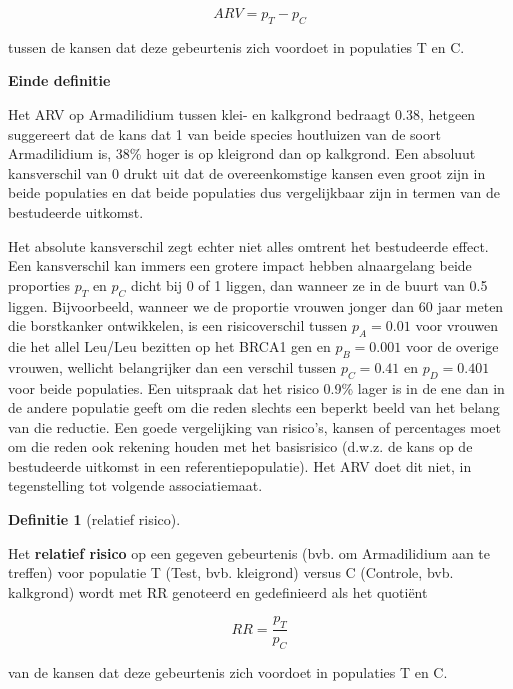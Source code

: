 \documentclass[
  12pt,dutch]{book}
\theoremstyle{definition}
\newtheorem{definition}{Definitie}[chapter]
\theoremstyle{definition}
\theoremstyle{definition}
\theoremstyle{definition}
\theoremstyle{remark}
\begin{document}
\begin{equation*}
ARV=p_T-p_C
\end{equation*}

tussen de kansen dat deze gebeurtenis zich voordoet in populaties T en C.

\textbf{Einde definitie}

Het ARV op Armadilidium tussen klei- en kalkgrond bedraagt 0.38, hetgeen suggereert dat de kans dat 1 van beide species houtluizen van de soort Armadilidium is, 38\% hoger is op kleigrond dan op kalkgrond. Een absoluut kansverschil
van 0 drukt uit dat de overeenkomstige kansen even groot zijn in beide
populaties en dat beide populaties dus vergelijkbaar zijn in termen van de bestudeerde uitkomst.

Het absolute kansverschil zegt echter niet alles omtrent het
bestudeerde effect. Een kansverschil kan immers een grotere impact hebben
alnaargelang beide proporties \(p_T\) en \(p_C\) dicht bij 0 of 1 liggen, dan
wanneer ze in de buurt van 0.5 liggen.
Bijvoorbeeld, wanneer we de proportie
vrouwen jonger dan 60 jaar meten die borstkanker ontwikkelen, is
een risicoverschil tussen \(p_A=0.01\) voor vrouwen die het allel Leu/Leu bezitten op het BRCA1 gen
en \(p_B=0.001\) voor de overige vrouwen, wellicht belangrijker dan een verschil tussen \(p_C=0.41\) en \(p_D=0.401\) voor beide populaties. Een uitspraak dat het risico 0.9\% lager is in de ene dan in de andere populatie geeft om die reden slechts een beperkt beeld van het belang van die reductie. Een goede vergelijking van risico's, kansen of percentages moet om die reden ook rekening houden met het basisrisico (d.w.z. de kans op de bestudeerde uitkomst in een referentiepopulatie). Het ARV doet dit niet, in tegenstelling tot volgende associatiemaat.

\begin{definition}[relatief risico]
\protect\hypertarget{def:unnamed-chunk-111}{}\label{def:unnamed-chunk-111}~
\end{definition}

Het \textbf{relatief risico} op een gegeven gebeurtenis (bvb. om Armadilidium aan te treffen) voor populatie T (Test, bvb. kleigrond) versus C (Controle, bvb. kalkgrond) wordt met RR
genoteerd en gedefinieerd als het quotiënt

\begin{equation*}
RR=\frac{p_T}{p_C}
\end{equation*}

van de kansen dat deze gebeurtenis zich voordoet in populaties T en C.
\end{document}
